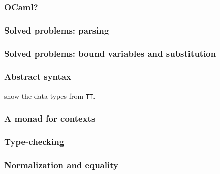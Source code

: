 \documentclass[10pt]{beamer}
\begin{document}
\begin{frame}
  \frametitle{OCaml?}
\end{frame}

\begin{frame}
  \frametitle{Solved problems: parsing}
\end{frame}

\begin{frame}
  \frametitle{Solved problems: bound variables and substitution}
\end{frame}

\begin{frame}
  \frametitle{Abstract syntax}

  show the data types from \texttt{TT}.
\end{frame}

\begin{frame}
  \frametitle{A monad for contexts}
\end{frame}

\begin{frame}
  \frametitle{Type-checking}
\end{frame}

\begin{frame}
  \frametitle{Normalization and equality}
\end{frame}
\end{document}
